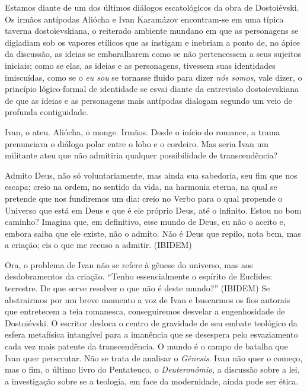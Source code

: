 Estamos diante de um dos últimos diálogos escatológicos da obra de
Dostoiévski. Os irmãos antípodas Aliócha e Ivan Karamázov encontram-se
em uma típica taverna dostoievskiana, o reiterado ambiente mundano em
que as personagens se digladiam sob os vapores etílicos que as instigam
e inebriam a ponto de, no ápice da discussão, as ideias se embaralharem
como se não pertencessem a seus sujeitos iniciais; como se elas, as
ideias e as personagens, tivessem suas identidades imiscuídas, como se o
\emph{eu sou} se tornasse fluido para dizer \emph{nós somos}, vale
dizer, o princípio lógico-formal de identidade se esvai diante da
entrevisão dostoievskiana de que as ideias e as personagens mais
antípodas dialogam segundo um veio de profunda contiguidade.

Ivan, o ateu. Aliócha, o monge. Irmãos. Desde o início do romance, a
trama prenunciava o diálogo polar entre o lobo e o cordeiro. Mas seria
Ivan um militante ateu que não admitiria qualquer possibilidade de
transcendência?

Admito Deus, não só voluntariamente, mas ainda sua sabedoria, seu fim
que nos escapa; creio na ordem, no sentido da vida, na harmonia eterna,
na qual se pretende que nos fundiremos um dia: creio no Verbo para o
qual propende o Universo que está em Deus e que é ele próprio Deus, até
o infinito. Estou no bom caminho? Imagina que, em definitivo, esse mundo
de Deus, eu não o aceito e, embora saiba que ele existe, não o admito.
Não é Deus que repilo, nota bem, mas a criação; eis o que me recuso a
admitir. (IBIDEM)

Ora, o problema de Ivan não se refere à gênese do universo, mas aos
desdobramentos da criação. ``Tenho essencialmente o espírito de
Euclides: terrestre. De que serve resolver o que não é deste mundo?''
(IBIDEM) Se abstrairmos por um breve momento a voz de Ivan e buscarmos
os fios autorais que entretecem a teia romanesca, conseguiremos desvelar
a engenhosidade de Dostoiévski. O escritor desloca o centro de gravidade
de seu embate teológico da esfera metafísica intangível para a imanência
que se desespera pelo esvaziamento cada vez mais patente da
transcendência. O mundo é o campo de batalha que Ivan quer perscrutar.
Não se trata de analisar o \emph{Gênesis}. Ivan não quer o começo, mas o
fim, o último livro do Pentateuco, o \emph{Deuteronômio}, a discussão
sobre a lei, a investigação sobre se a teologia, em face da modernidade,
ainda pode ser ética.

